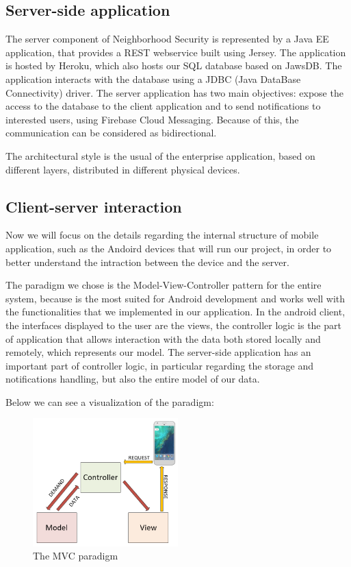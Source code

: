 \documentclass[a4paper]{scrreprt}
\begin{document}
\subsection{Server-side application}
The server component of Neighborhood Security is represented by a Java EE application, that provides a REST webservice built using Jersey. The application is hosted by Heroku, which also hosts our SQL database based on JawsDB. The application interacts with the database using a JDBC (Java DataBase Connectivity) driver. The server application has two main objectives: expose the access to the database to the client application and to send notifications to interested users, using Firebase Cloud Messaging. Because of this, the communication can be considered as bidirectional.
\par The architectural style is the usual of the enterprise application, based on different layers, distributed in different physical devices.

\subsection{Client-server interaction}
Now we will focus on the details regarding the internal structure of mobile application, such as the Andoird devices that will run our project, in order to better understand the intraction between the device and the server.
\par The paradigm we chose is the Model-View-Controller pattern for the entire system, because is the most suited for Android development and works well with the functionalities that we implemented in our application. In the android client, the interfaces displayed to the user are the views, the controller logic is the part of application that allows interaction with the data both stored locally and remotely, which represents our model. The server-side application has an important part of controller logic, in particular regarding the storage and notifications handling, but also the entire model of our data.
\par Below we can see a visualization of the paradigm:

\begin{figure}[H]
	\centering
	\includegraphics[width=0.5\textwidth]{mvc}
	\caption{The MVC paradigm}
\end{figure}
\end{document}
